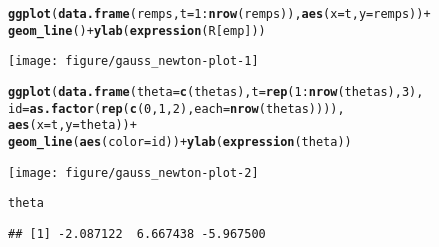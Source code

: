 \documentclass[a4paper]{article}
\makeatletter
\newcommand{\hlnum}[1]{\textcolor[rgb]{0.686,0.059,0.569}{#1}}%
\newcommand{\hlopt}[1]{\textcolor[rgb]{0,0,0}{#1}}%
\newcommand{\hlstd}[1]{\textcolor[rgb]{0.345,0.345,0.345}{#1}}%
\newcommand{\hlkwc}[1]{\textcolor[rgb]{0.333,0.667,0.333}{#1}}%
\newcommand{\hlkwd}[1]{\textcolor[rgb]{0.737,0.353,0.396}{\textbf{#1}}}%
\newenvironment{kframe}{%
 \def\at@end@of@kframe{}%
 \ifinner\ifhmode%
  \def\at@end@of@kframe{\end{minipage}}%
  \begin{minipage}{\columnwidth}%
 \fi\fi%
 \def\FrameCommand##1{\hskip\@totalleftmargin \hskip-\fboxsep
 \colorbox{shadecolor}{##1}\hskip-\fboxsep
     \hskip-\linewidth \hskip-\@totalleftmargin \hskip\columnwidth}%
 \MakeFramed {\advance\hsize-\width
   \@totalleftmargin\z@ \linewidth\hsize
   \@setminipage}}%
 {\par\unskip\endMakeFramed%
 \at@end@of@kframe}
\newenvironment{knitrout}{}{} %
\makeatother
\begin{document}
{\begin{enumerate}
\begin{knitrout}
\begin{kframe}
\begin{alltt}
\hlkwd{ggplot}\hlstd{(}\hlkwd{data.frame}\hlstd{(remps,} \hlkwc{t}\hlstd{=}\hlnum{1}\hlopt{:}\hlkwd{nrow}\hlstd{(remps)),} \hlkwd{aes}\hlstd{(}\hlkwc{x}\hlstd{=t,} \hlkwc{y}\hlstd{=remps))} \hlopt{+}
  \hlkwd{geom_line}\hlstd{()} \hlopt{+} \hlkwd{ylab}\hlstd{(}\hlkwd{expression}\hlstd{(R[emp]))}
\end{alltt}
\end{kframe}
\texttt{[image: figure/gauss\_newton-plot-1]} 
\begin{kframe}\begin{alltt}
\hlkwd{ggplot}\hlstd{(}\hlkwd{data.frame}\hlstd{(}\hlkwc{theta} \hlstd{=} \hlkwd{c}\hlstd{(thetas),} \hlkwc{t}\hlstd{=}\hlkwd{rep}\hlstd{(}\hlnum{1}\hlopt{:}\hlkwd{nrow}\hlstd{(thetas),}\hlnum{3}\hlstd{),}
                \hlkwc{id} \hlstd{=} \hlkwd{as.factor}\hlstd{(}\hlkwd{rep}\hlstd{(}\hlkwd{c}\hlstd{(}\hlnum{0}\hlstd{,} \hlnum{1}\hlstd{,} \hlnum{2}\hlstd{),} \hlkwc{each}\hlstd{=} \hlkwd{nrow}\hlstd{(thetas)))),}
       \hlkwd{aes}\hlstd{(}\hlkwc{x} \hlstd{= t,} \hlkwc{y}\hlstd{=theta))} \hlopt{+}
  \hlkwd{geom_line}\hlstd{(}\hlkwd{aes}\hlstd{(}\hlkwc{color} \hlstd{= id))} \hlopt{+} \hlkwd{ylab}\hlstd{(}\hlkwd{expression}\hlstd{(theta))}
\end{alltt}
\end{kframe}
\texttt{[image: figure/gauss\_newton-plot-2]} 
\begin{kframe}\begin{alltt}
\hlstd{theta}
\end{alltt}
\begin{verbatim}
## [1] -2.087122  6.667438 -5.967500
\end{verbatim}
\end{kframe}
\end{knitrout}
\end{enumerate}

}
\end{document}

